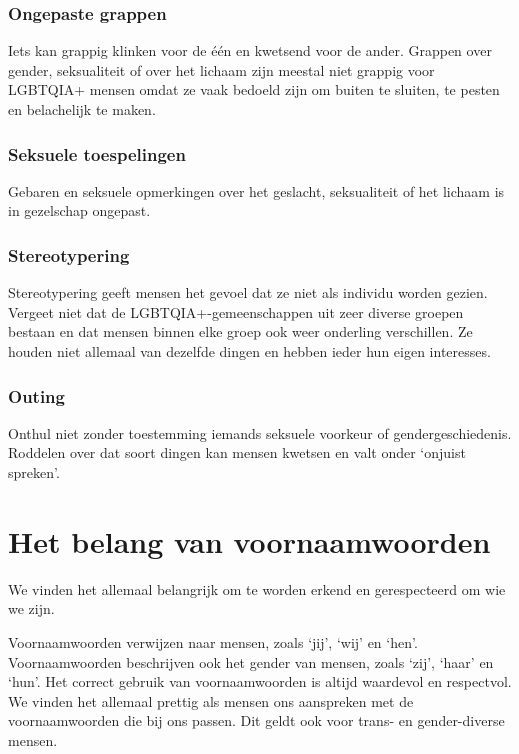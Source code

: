 \documentclass[12pt,openany]{book}
\begin{document}
\subsubsection*{Ongepaste grappen} 

Iets kan grappig klinken voor de één en kwetsend voor de ander. Grappen over gender, seksualiteit of over het lichaam zijn meestal niet grappig voor LGBTQIA+ mensen omdat ze vaak bedoeld zijn om buiten te sluiten, te pesten en belachelijk te maken. 

\subsubsection*{Seksuele toespelingen}

Gebaren en seksuele opmerkingen over het geslacht, seksualiteit of het lichaam is in gezelschap ongepast.

\subsubsection*{Stereotypering}

Stereotypering geeft mensen het gevoel dat ze niet als individu worden gezien. Vergeet niet dat de LGBTQIA+-gemeenschappen uit zeer diverse groepen bestaan en dat mensen binnen elke groep ook weer onderling verschillen. Ze houden niet allemaal van dezelfde dingen en hebben ieder hun eigen interesses. 

\subsubsection*{Outing}

Onthul niet zonder toestemming iemands seksuele voorkeur of gendergeschiedenis. Roddelen over dat soort dingen kan mensen kwetsen en valt onder ‘onjuist spreken’.

\section*{Het belang van voornaamwoorden}

We vinden het allemaal belangrijk om te worden erkend en gerespecteerd om wie we zijn.

Voornaamwoorden verwijzen naar mensen, zoals ‘jij’, ‘wij’ en ‘hen’. Voornaamwoorden beschrijven ook het gender van mensen, zoals ‘zij’, ‘haar’ en ‘hun’. Het correct gebruik van voornaamwoorden is altijd waardevol en respectvol. We vinden het allemaal prettig als mensen ons aanspreken met de voornaamwoorden die bij ons passen. Dit geldt ook voor trans- en gender-diverse mensen. 
\end{document}
